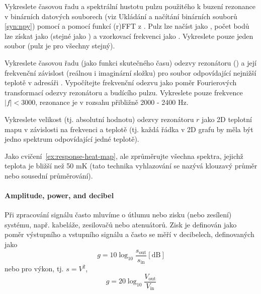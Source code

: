 \begin{exercise}
    Vykreslete časovou řadu a spektrální hustotu pulzu použitého k buzení rezonance v binárních datových souborech  (viz Ukládání a načítání binárních souborů \ref{syn:npy}) pomocí  a pomocí funkcí (r)FFT z . Pulz lze načíst jako , počet bodů lze získat jako  (stejné jako ) a vzorkovací frekvenci jako . Vykreslete pouze jeden soubor (pulz je pro všechny stejný).
\end{exercise}

\begin{exercise}
    Vykreslete časovou řadu (jako funkci skutečného času) odezvy rezonátoru () a její frekvenční závislost (reálnou i imaginární složku) pro soubor odpovídající nejnižší teplotě v adresáři . Vypočítejte frekvenční odezvu jako poměr Fourierových transformací odezvy rezonátoru a budícího pulzu. Vykreslete pouze frekvence $|f| < 3000$, rezonance je v rozsahu přibližně 2000 - 2400 Hz.
\end{exercise}

\begin{exercise}
    \label{ex:response-heat-map}
    Vykreslete velikost (tj. absolutní hodnotu) odezvy rezonátoru $r$ jako 2D teplotní mapu v závislosti na frekvenci a teplotě (tj. každá řádka v 2D grafu by měla být jedno spektrum odpovídající jedné teplotě).
\end{exercise}

\begin{exercise}
    Jako cvičení~\ref{ex:response-heat-map}, ale zprůměrujte všechna spektra, jejichž teplota je bližší než 50 mK (tato technika vyhlazování se nazývá klouzavý průměr nebo sousední průměrování).
\end{exercise}

\paragraph{Amplitude, power, and decibel}

Při zpracování signálu často mluvíme o útlumu nebo zisku (nebo zesílení) systému, např. kabeláže, zesilovačů nebo atenuátorů. Zisk je definován jako poměr výstupního a vstupního signálu a často se měří v decibelech, definovaných jako
\begin{equation}
    g = 10\log_{10}\frac{s_\mathrm{out}}{s_\mathrm{in}} \mathrm{[dB]}
\end{equation}
nebo pro výkon, tj. $s = V^2$,
\begin{equation}
    g = 20\log_{10}\frac{V_\mathrm{out}}{V_\mathrm{in}}
\end{equation}

